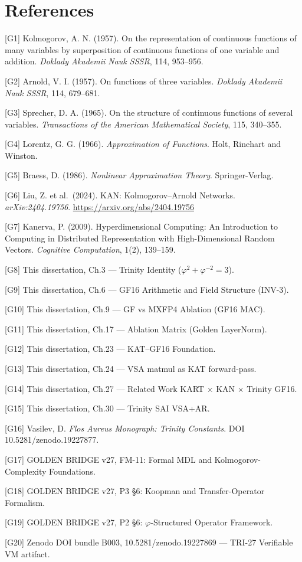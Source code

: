 \section{References}
\label{app:G-references}

[G1] Kolmogorov, A. N. (1957). On the representation of continuous
functions of many variables by superposition of continuous functions of
one variable and addition. \emph{Doklady Akademii Nauk SSSR}, 114,
953--956.

[G2] Arnold, V. I. (1957). On functions of three variables.
\emph{Doklady Akademii Nauk SSSR}, 114, 679--681.

[G3] Sprecher, D. A. (1965). On the structure of continuous functions
of several variables. \emph{Transactions of the American Mathematical
Society}, 115, 340--355.

[G4] Lorentz, G. G. (1966). \emph{Approximation of Functions}. Holt,
Rinehart and Winston.

[G5] Braess, D. (1986). \emph{Nonlinear Approximation Theory}.
Springer-Verlag.

[G6] Liu, Z. et al.~(2024). KAN: Kolmogorov--Arnold Networks.
\emph{arXiv:2404.19756}.
\url{https://arxiv.org/abs/2404.19756}

[G7] Kanerva, P. (2009). Hyperdimensional Computing: An Introduction to
Computing in Distributed Representation with High-Dimensional Random
Vectors. \emph{Cognitive Computation}, 1(2), 139--159.

[G8] This dissertation, Ch.3 --- Trinity Identity
($\varphi^2 + \varphi^{-2} = 3$).

[G9] This dissertation, Ch.6 --- GF16 Arithmetic and Field Structure
(INV-3).

[G10] This dissertation, Ch.9 --- GF vs MXFP4 Ablation (GF16 MAC).

[G11] This dissertation, Ch.17 --- Ablation Matrix (Golden LayerNorm).

[G12] This dissertation, Ch.23 --- KAT--GF16 Foundation.

[G13] This dissertation, Ch.24 --- VSA matmul as KAT forward-pass.

[G14] This dissertation, Ch.27 --- Related Work KART $\times$ KAN
$\times$ Trinity GF16.

[G15] This dissertation, Ch.30 --- Trinity SAI VSA+AR.

[G16] Vasilev, D. \emph{Flos Aureus Monograph: Trinity Constants}.
DOI 10.5281/zenodo.19227877.

[G17] GOLDEN BRIDGE v27, FM-11: Formal MDL and Kolmogorov-Complexity
Foundations.

[G18] GOLDEN BRIDGE v27, P3 \S6: Koopman and Transfer-Operator
Formalism.

[G19] GOLDEN BRIDGE v27, P2 \S6: $\varphi$-Structured Operator
Framework.

[G20] Zenodo DOI bundle B003, 10.5281/zenodo.19227869 --- TRI-27
Verifiable VM artifact.
